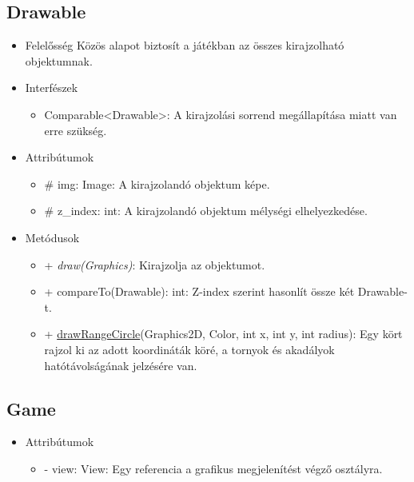 \subsection{Drawable}
\begin{itemize}
\item Felelősség \newline
Közös alapot biztosít a játékban az összes kirajzolható objektumnak.
\item Interfészek
\begin{itemize}
	\item Comparable<Drawable>: A kirajzolási sorrend megállapítása miatt van erre szükség.
\end{itemize}
\item Attribútumok
	\begin{itemize}
		\item \# img: Image: A kirajzolandó objektum képe.
		\item \# z\_index: int: A kirajzolandó objektum mélységi elhelyezkedése.
	\end{itemize}
\item Metódusok
	\begin{itemize}
		\item + \textit{draw(Graphics)}: Kirajzolja az objektumot.
		\item + compareTo(Drawable): int: Z-index szerint hasonlít össze két Drawable-t.
		\item + \underline{drawRangeCircle}(Graphics2D, Color, int x, int y, int radius): Egy kört rajzol ki az adott koordináták köré, a tornyok és akadályok hatótávolságának jelzésére van.
	\end{itemize}
\end{itemize}

\subsection{Game}
\begin{itemize}
\item Attribútumok
	\begin{itemize}
		\item - view: View: Egy referencia a grafikus megjelenítést végző osztályra.
	\end{itemize}
\end{itemize}

